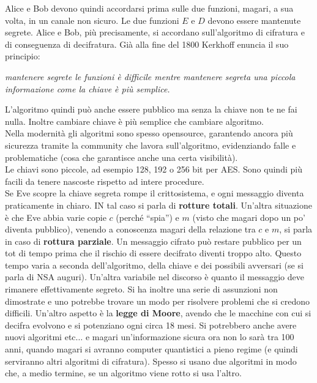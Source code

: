 \documentclass[a4paper,12pt, oneside]{book}
\begin{document}
Alice e Bob devono quindi accordarsi prima sulle due funzioni, magari, a sua
volta, in un canale non sicuro. Le due funzioni $E$ e $D$ devono essere
mantenute segrete. Alice e Bob, più precisamente, si accordano sull'algoritmo di
cifratura e di conseguenza di decifratura. Già alla fine del 1800 Kerkhoff
enuncia il suo principio:
\begin{center}
  \textit{mantenere segrete le funzioni è difficile mentre mantenere segreta una
  piccola informazione come la chiave è più semplice.}
\end{center}
L'algoritmo quindi può anche essere pubblico ma senza la chiave non te ne fai
nulla. Inoltre cambiare chiave è più semplice che cambiare algoritmo.\\
Nella modernità gli algoritmi sono spesso opensource, garantendo ancora più
sicurezza tramite la community che lavora sull'algoritmo, evidenziando falle e
problematiche (cosa che garantisce anche una certa visibilità).\\
Le chiavi sono piccole, ad esempio 128, 192 o 256 bit per AES. Sono quindi più
facili da tenere nascoste rispetto ad intere procedure.\\
Se Eve scopre la chiave segreta rompe il crittosistema, e ogni messaggio diventa
praticamente in chiaro. IN tal caso si parla di \textbf{rotture
  totali}. Un'altra situazione è che Eve abbia varie copie $c$ (perché ``spia'')
e $m$ (visto che magari dopo un po' diventa pubblico), venendo a conoscenza
magari della relazione tra $c$ e $m$, si parla in caso di \textbf{rottura
  parziale}. Un messaggio cifrato può restare pubblico per un tot di tempo prima
che il rischio di essere decifrato diventi troppo alto. Questo tempo varia a
seconda dell'algoritmo, della chiave e dei possibili avversari (se si parla di
NSA auguri). Un'altra variabile nel discorso è quanto il messaggio deve rimanere
effettivamente segreto. Si ha inoltre una serie di assunzioni non dimostrate e
uno potrebbe trovare un modo per risolvere problemi che si credono
difficili. Un'altro aspetto è la \textbf{legge di Moore}, avendo che le macchine
con cui si decifra evolvono e si potenziano ogni circa 18 mesi. Si potrebbero
anche avere nuovi algoritmi etc$\ldots$ e magari un'informazione sicura ora non
lo sarà tra 100 anni, quando magari si avranno computer quantistici a pieno
regime (e quindi serviranno altri algoritmi di cifratura). Spesso si usano due
algoritmi in modo che, a medio termine, se un algoritmo viene rotto si usa
l'altro. 
\end{document}
